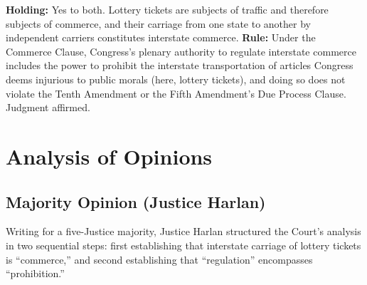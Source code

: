 \documentclass[12pt]{article}
\begin{document}
\textbf{Holding:} Yes to both. Lottery tickets are subjects of traffic and therefore subjects of commerce, and their carriage from one state to another by independent carriers constitutes interstate commerce. \textbf{Rule:} Under the Commerce Clause, Congress's plenary authority to regulate interstate commerce includes the power to prohibit the interstate transportation of articles Congress deems injurious to public morals (here, lottery tickets), and doing so does not violate the Tenth Amendment or the Fifth Amendment's Due Process Clause. Judgment affirmed.

\section{Analysis of Opinions}
\subsection{Majority Opinion (Justice Harlan)}

Writing for a five-Justice majority, Justice Harlan structured the Court's analysis in two sequential steps: first establishing that interstate carriage of lottery tickets is ``commerce,'' and second establishing that ``regulation'' encompasses ``prohibition.''
\end{document}
